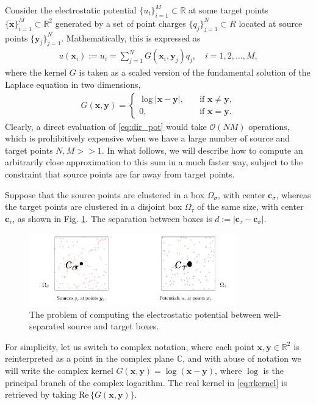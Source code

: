 \documentclass[final,onefignum,onetabnum]{siamart220329}
\newcommand{\bol}{\boldsymbol}
\newcommand{\real}{\mathrm{Re}\,}
\newcommand{\R}{\mathbb{R}}
\newcommand{\C}{\mathbb{C}}
\newcommand{\Ocal}{\mathcal{O}}
\newcommand{\abs}[1]{\left|#1\right|}
\begin{document}
Consider the electrostatic potential $\{u_i\}_{i=1}^M \subset \R$ at some target points $\{\bol{x}\}_{i=1}^M \subset \R^2$ generated by a set of point charges $\{q_j\}_{j=1}^N \subset R$ located at source points $\{\bol y_j\}_{j=1}^N$. Mathematically, this is expressed as
\begin{align}
	u(\bol x_i) := u_i = \sum_{j=1}^{N} G(\bol x_i, \bol y_j)q_j, \quad i = 1,2,\dots,M, \label{eq:dir_pot}
\end{align}
where the kernel $G$ is taken as a scaled version of the fundamental solution of the Laplace equation in two dimensions,
\begin{align}
	G(\bol x, \bol y) = \begin{cases}
		\log \abs{\bol x-\bol y}, \quad &\text{if } \bol x \neq \bol y,\\
		0 , \quad &\text{if } \bol x = \bol y.  \label{eq:rkernel}
	\end{cases}
\end{align}
Clearly, a direct evaluation of \cref{eq:dir_pot} would take $\Ocal(NM)$ operations, which is prohibitively expensive when we have a large number of source and target points $N,M >> 1$. In what follows, we will describe how to compute an arbitrarily close approximation to this sum in a much faster way, subject to the constraint that source points are far away from target points.

Suppose that the source points are clustered in a box $\Omega_\sigma$, with center $\bol c_\sigma$, whereas the target points are clustered in a disjoint box $\Omega_\tau$ of the same size, with center $\bol c_\tau$, as shown in Fig. \ref{fig:stboxes}. The separation between boxes is $d:=\abs{\bol c_\tau-\bol c_\sigma}$.

\begin{figure}[h]
	\centering
	\includegraphics[width=0.8\textwidth]{stboxes}
	\caption{The problem of computing the electrostatic potential between well-separated source and target boxes.}
	\label{fig:stboxes}
\end{figure}

For simplicity, let us switch to complex notation, where each point $\bol x, \bol y \in \R^2$ is reinterpreted as a point in the complex plane $\C$, and with abuse of notation we will write the complex kernel $G(\bol x, \bol y) = \log(\bol x-\bol y)$, where $\log$ is the principal branch of the complex logarithm. The real kernel in \cref{eq:rkernel} is retrieved by taking $\real\{G(\bol x, \bol y)\}$.
\end{document}
